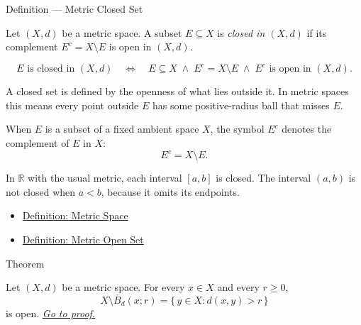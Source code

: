 \begin{definitionbox}{Definition --- Metric Closed Set}
\begin{definition}\label{def:metric-closed-set}
Let \((X,d)\) be a metric space.  A subset \(E\subseteq X\) is \emph{closed in
\((X,d)\)} if its complement \(E^c=X\setminus E\) is open in \((X,d)\).
\end{definition}
\end{definitionbox}

\begin{remark*}
\[
E\text{ is closed in }(X,d)
\quad\Longleftrightarrow\quad
E\subseteq X
\;\land\;
E^c=X\setminus E
\;\land\;
E^c\text{ is open in }(X,d).
\]
\end{remark*}

\begin{remark*}[Interpretation]
A closed set is defined by the openness of what lies outside it.  In metric
spaces this means every point outside \(E\) has some positive-radius ball that
misses \(E\).
\end{remark*}

\begin{remark*}[Notation]
When \(E\) is a subset of a fixed ambient space \(X\), the symbol \(E^c\)
denotes the complement of \(E\) in \(X\):
\[
  E^c=X\setminus E.
\]
\end{remark*}

\begin{remark*}[Examples]
In \(\mathbb{R}\) with the usual metric, each interval \([a,b]\) is closed.
The interval \((a,b)\) is not closed when \(a<b\), because it omits its
endpoints.
\end{remark*}

\begin{dependencies}
\begin{itemize}
  \item \hyperref[def:metric-space]{Definition: Metric Space}
  \item \hyperref[def:metric-open-set]{Definition: Metric Open Set}
\end{itemize}
\end{dependencies}

\begin{theorembox}{Theorem}
\begin{theorem}
\label{thm:metric-complement-closed-ball-open}
Let \((X,d)\) be a metric space.  For every \(x\in X\) and every \(r\geq 0\),
\[
  X\setminus \overline{B}_d(x;r)
  =
  \{\,y\in X:d(x,y)>r\,\}
\]
is open.
\hyperref[prf:metric-complement-closed-ball-open]{\textit{Go to proof.}}
\end{theorem}
\end{theorembox}

